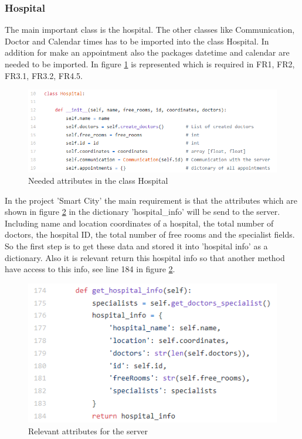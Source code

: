 \subsubsection{Hospital}
The main important class is the hospital. The other classes like Communication, Doctor and Calendar times has to be imported into the class Hospital. In addition for make an appointment also the packages datetime and calendar are needed to be imported. In figure \ref{hospital_attributes} is represented which is required in FR1, FR2, FR3.1, FR3.2, FR4.5.

\begin{figure}[H]
\centering
\sidecaption
\includegraphics[scale=.65]{images/melanie_images/Relevant_attributes_in_the_hopital_class.png}
\caption{Needed attributes in the class Hospital}
\label{hospital_attributes}
\end{figure}


In the project 'Smart City' the main requirement is that the attributes which are shown in figure \ref{Relevant_attributes_server} in the dictionary 'hospital_info' will be send to the server. Including name and location coordinates of a hospital, the total number of doctors, the hospital ID, the total number of free rooms and the specialist fields. So the first step is to get these data and stored it into 'hospital info' as a dictionary. Also it is relevant return this hospital info so that another method have access to this info, see line 184 in figure \ref{Relevant_attributes_server}. 

\begin{figure}[H]
\centering
\sidecaption
\includegraphics[scale=.65]{images/melanie_images/get_hospital_info.png}
\caption{Relevant attributes for the server}
\label{Relevant_attributes_server}
\end{figure}

